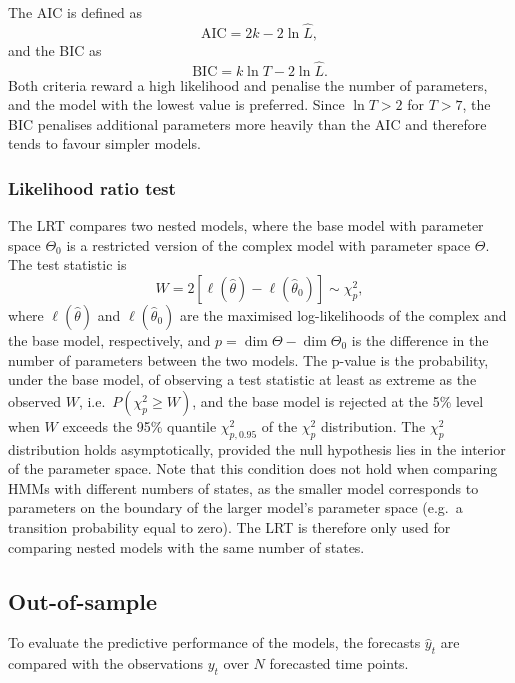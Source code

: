 The AIC \parencite[Sec.~6.1]{zucchini2016} is defined as
\begin{equation}
    \mathrm{AIC} = 2k - 2\ln \hat{L},
\end{equation}
and the BIC \parencite[Sec.~6.1]{zucchini2016} as
\begin{equation}
    \mathrm{BIC} = k \ln T - 2\ln \hat{L}.
\end{equation}
Both criteria reward a high likelihood and penalise the number of parameters,
and the model with the lowest value is preferred. Since $\ln T > 2$ for $T > 7$,
the BIC penalises additional parameters more heavily than the AIC and therefore
tends to favour simpler models.

\subsubsection{Likelihood ratio test}
The LRT \parencite[Sec.~9.5]{pawitan2001} compares two nested models, where the base model
with parameter space $\Theta_0$ is a restricted version of the complex model with
parameter space $\Theta$. The test statistic is
\begin{equation}
    W = 2\left[\ell(\hat{\theta}) - \ell(\hat{\theta}_0)\right] \sim \chi^2_p,
\end{equation}
where $\ell(\hat{\theta})$ and $\ell(\hat{\theta}_0)$ are the maximised
log-likelihoods of the complex and the base model, respectively, and
$p = \dim\Theta - \dim\Theta_0$ is the difference in the number of parameters between
the two models. The p-value is the probability, under the base model, of observing a test statistic at
least as extreme as the observed $W$, i.e.\ $P(\chi^2_p \geq W)$, and the base model
is rejected at the 5\% level when $W$ exceeds the 95\% quantile $\chi^2_{p,0.95}$ of the
$\chi^2_p$ distribution. The $\chi^2_p$ distribution holds asymptotically, provided the
null hypothesis lies in the interior of the parameter space. Note that this condition does not hold when
comparing HMMs with different numbers of states, as the smaller model corresponds
to parameters on the boundary of the larger model's parameter space
(e.g.\ a transition probability equal to zero). The LRT is therefore only used
for comparing nested models with the same number of states.

\subsection{Out-of-sample}
To evaluate the predictive performance of the models, the forecasts $\hat{y}_t$ are compared
with the observations $y_t$ over $N$ forecasted time points.

